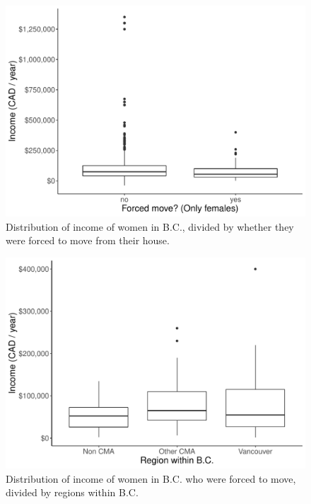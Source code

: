 \documentclass[11pt]{article}
\begin{document}
\begin{figure}
  \centering
  \includegraphics[scale=0.5]{fig/income_gender.pdf}
  \caption{Distribution of income of women in B.C., divided by
  whether they were forced to move from their house.}
  \label{fig:income_gender}
\end{figure}



\begin{figure}
  \centering
  \includegraphics[scale=0.5]{fig/income_location.pdf}
  \caption{Distribution of income of women in B.C. who were forced
  to move, divided by regions within B.C.}
  \label{fig:income_location}
\end{figure}
\end{document}
